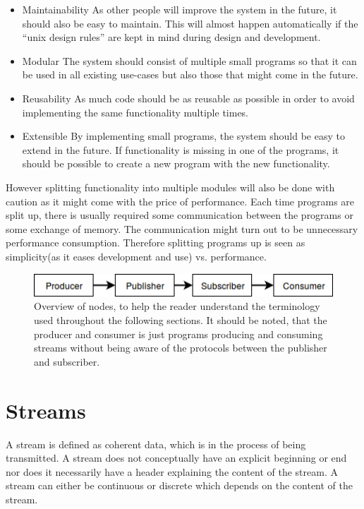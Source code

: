 \begin{itemize}
	\item Maintainability
As other people will improve the system in the future, it should also be easy to maintain. This will almost happen automatically if the “unix design rules” are kept in mind during design and development.
\item Modular
The system should consist of multiple small programs so that it can be used in all existing use-cases but also those that might come in the future.
\item Reusability
As much code should be as reusable as possible in order to avoid implementing the same functionality multiple times.
\item Extensible
    By implementing small programs, the system should be easy to extend in the future.
    If functionality is missing in one of the programs, it should be possible to create a new 
    program with the new functionality.
\end{itemize}

However splitting functionality into multiple modules will also be done with caution as it might come with the price of performance. Each time programs are split up, there is usually required some communication between the programs or some exchange of memory. The communication might turn out to be unnecessary performance consumption. Therefore splitting programs up is seen as simplicity(as it eases development and use) vs. performance.



\begin{figure}[h!]
	\includegraphics[width=1\textwidth]{figures/analysis-terminilogy-overview.png}
	\caption{Overview of nodes, to help the reader understand the terminology used throughout the following sections. It should be noted, that the producer and consumer is just programs producing and consuming streams without being aware of the protocols between the publisher and subscriber.}
\end{figure}

\section{Streams}
A stream is defined as coherent data, which is in the process of being transmitted. A stream does not conceptually have an explicit beginning or end nor does it necessarily have a header explaining the content of the stream. A stream can either be continuous or discrete which depends on the content of the stream. 


